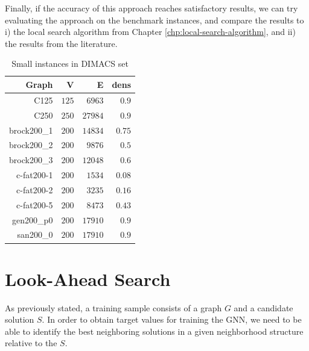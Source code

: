 \documentclass[draft,final]{vutinfth} %
\begin{document}
Finally, if the accuracy of this approach reaches satisfactory results, we can try evaluating the approach on the benchmark instances, and compare the results to i) the local search algorithm from Chapter \ref{chp:local-search-algorithm}, and ii) the results from the literature. 


\begin{table}
\begin{center}
    \begin{tabular}{ rrrr } 
        Graph &   V &  E & dens \\ \hline
        C125 &  $125$ &    $6963$ &  $0.9$ \\
        C250 &  $250$ &   $27984$ &  $0.9$ \\
brock200\_1 &  $200$ &   $14834$ &  $0.75$ \\
brock200\_2 &  $200$ &    $9876$ & $0.5$ \\
brock200\_3 &  $200$ &   $12048$ &   $0.6$ \\
c-fat200-1 &  $200$ &    $1534$ &  $0.08$ \\
c-fat200-2 &  $200$ &    $3235$ & $0.16$ \\
c-fat200-5 &  $200$ &    $8473$ & $0.43$ \\
gen200\_p0 &  $200$ &   $17910$ & $0.9$ \\
san200\_0 &  $200$ &   $17910$ & $0.9$ \\
    \end{tabular}
    \caption{Small instances in DIMACS set}
    \label{tab:first-approach}
\end{center}
\end{table}

\section{Look-Ahead Search}\label{sec:lookahead-search}

As previously stated, a training sample consists of a graph $G$ and a candidate solution $S$. 
In order to obtain target values for training the GNN, we need to be able to identify the best neighboring solutions in a given neighborhood structure relative to the $S$. 
\end{document}
